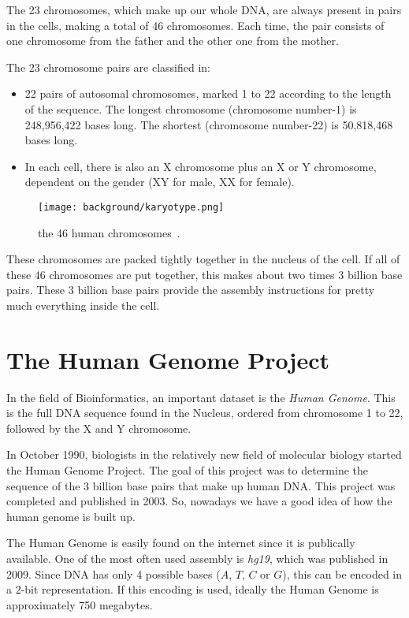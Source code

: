 The 23 chromosomes, which make up our whole DNA, are always present in pairs in the cells, making a total of 46 chromosomes. Each time, the pair consists of one chromosome from the father and the other one from the mother. 

The 23 chromosome pairs are classified in:
\begin{itemize}
	\item 22 pairs of autosomal chromosomes, marked 1 to 22 according to the length of the sequence. The longest chromosome (chromosome number-1) is 248,956,422 bases long. The shortest (chromosome number-22) is 50,818,468 bases long.
	\item In each cell, there is also an X chromosome plus an X or Y chromosome, dependent on the gender (XY for male, XX for female).
\end{itemize}


\begin{figure}[H]
	\centering
	\texttt{[image: background/karyotype.png]}
	\caption{the 46 human chromosomes~\cite{Karyotype}.}
	\label{fig:karyotype}
\end{figure}

These chromosomes are packed tightly together in the nucleus of the cell. If all of these 46 chromosomes are put together, this makes about two times 3 billion base pairs. These 3 billion base pairs provide the assembly instructions for pretty much everything inside the cell.


\section{The Human Genome Project}

In the field of Bioinformatics, an important dataset is the \emph{Human Genome}. This is the full DNA sequence found in the Nucleus, ordered from chromosome 1 to 22, followed by the X and Y chromosome.

In October 1990, biologists in the relatively new field of molecular biology started the Human Genome Project. The goal of this project was to determine the sequence of the 3 billion base pairs that make up human DNA. This project was completed and published in 2003. So, nowadays we have a good idea of how the human genome is built up.

The Human Genome is easily found on the internet since it is publically available. One of the most often used assembly is \emph{hg19}, which was published in 2009. Since DNA has only 4 possible bases ($A$, $T$, $C$ or $G$), this can be encoded in a 2-bit representation. If this encoding is used, ideally the Human Genome is approximately 750 megabytes.

